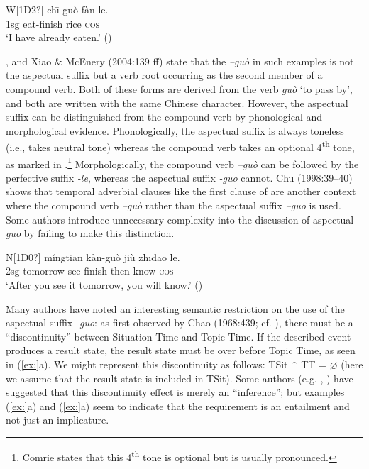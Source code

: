 \ea
\gll W[1D2?]  ch\={\i}-guò  fàn  le.\\
1sg  eat-finish  rice  \textsc{cos}\\
\glt ‘I have already eaten.’  (\citealt{Ma1977})
\z


\citet[251]{Chao1968}, \citet[59]{Comrie1976} and Xiao \& McEnery (2004:139 ff) state that the \textit{–guò} in such examples is not the aspectual suffix but a verb root occurring as the second member of a compound verb. Both of these forms are derived from the verb \textit{guò} ‘to pass by’, and both are written with the same Chinese character. However, the aspectual suffix can be distinguished from the compound verb by phonological and morphological evidence. Phonologically, the aspectual suffix is always toneless (i.e., takes neutral tone) whereas the compound verb takes an optional 4\textsuperscript{th} tone, as marked in .\footnote{Comrie states that this 4\textsuperscript{th} tone is optional but is usually pronounced.} Morphologically, the compound verb \textit{–guò} can be followed by the perfective suffix \textit{-le}, whereas the aspectual suffix \textit{-guo} cannot. Chu (1998:39–40) shows that temporal adverbial clauses like the first clause of  are another context where the compound verb \textit{–guò} rather than the aspectual suffix \textit{–guo} is used. Some authors introduce unnecessary complexity into the discussion of aspectual \textit{-guo} by failing to make this distinction.


\ea
\gll N[1D0?]  míngtian  kàn-guò  jiù  zh\={\i}dao  le.\\
2sg  tomorrow  see-finish  then  know  \textsc{cos}\\
\glt ‘After you see it tomorrow, you will know.’  (\citealt{Chen1979})
\z


Many authors have noted an interesting semantic restriction on the use of the aspectual suffix \textit{-guo}: as first observed by Chao (1968:439; cf. \citealt{Yeh1996}), there must be a “discontinuity” between Situation Time and Topic Time. If the described event produces a result state, the result state must be over before Topic Time, as seen in (\ref{ex:}a). We might represent this discontinuity as follows: TSit ${\cap}$ TT = ⌀ (here we assume that the result state is included in TSit). Some authors (e.g. \citealt{Iljic1990}, \citealt{Yeh1996}) have suggested that this discontinuity effect is merely an “inference”; but examples (\ref{ex:}a) and (\ref{ex:}a) seem to indicate that the requirement is an entailment and not just an implicature.


